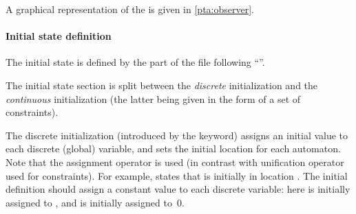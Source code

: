 A graphical representation of the \IPTA{}  is given in \cref{pta:observer}.


\paragraph{Initial state definition}

The initial state is defined by the part of the file following ``''.

The initial state section is split between the \emph{discrete} initialization and the \emph{continuous} initialization (the latter being given in the form of a set of constraints).


The discrete initialization (introduced by the  keyword) assigns an initial value to each discrete (global) variable, and sets the initial location for each automaton.
Note that the assignment operator \styleIMI{:=} is used (in contrast with unification operator \styleIMI{=} used for constraints).
%
%
For example,  states that  is initially in location .
The initial definition should assign a constant value to each discrete variable:
here  is initially assigned to , and  is initially assigned to~0.

